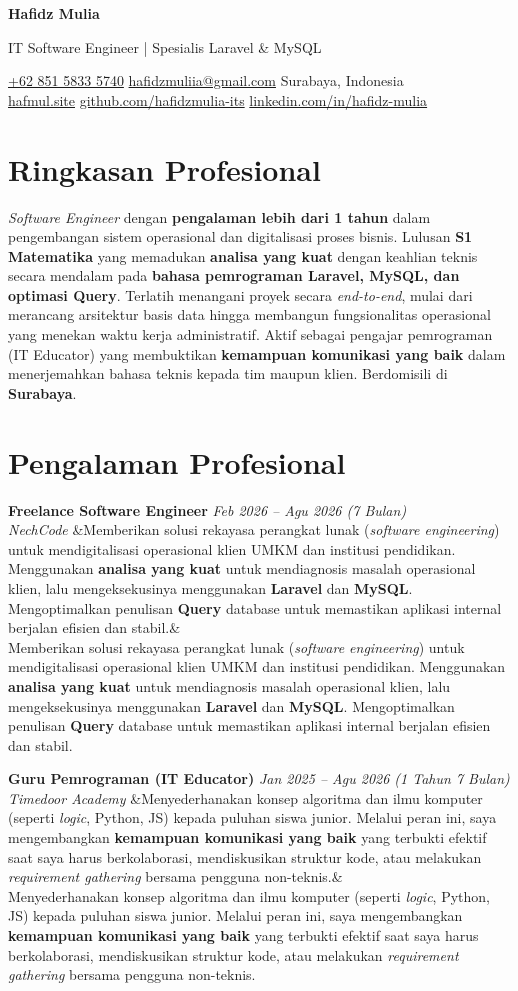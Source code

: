 \documentclass[a4paper,11pt]{article}
\newcommand{\cvname}[1]{%
  {\centering\LARGE\bfseries #1\par\vspace{2pt}}%
}
\newcommand{\cvtitle}[1]{%
  {\centering\large\color{accent} #1\par\vspace{4pt}}%
}
\newcommand{\cvcontact}[1]{%
  {\centering\small #1\par\vspace{6pt}}%
}
\newcommand{\cventry}[4]{%
  \noindent\textbf{#1} \hfill \textit{#3} \\
  \textit{#2}
  \ifx&#4& \else \\ \small #4 \fi
  \vspace{6pt}
}
\begin{document}
\cvname{Hafidz Mulia}
\cvtitle{IT Software Engineer | Spesialis Laravel \& MySQL}
\cvcontact{%
  \href{tel:+6285158335740}{+62 851 5833 5740} \quad\textbar\quad
  \href{mailto:hafidzmuliia@gmail.com}{hafidzmuliia@gmail.com} \quad\textbar\quad
  Surabaya, Indonesia \\
  \href{https://hafmul.site}{hafmul.site} \quad\textbar\quad
  \href{https://github.com/hafidzmulia-its}{github.com/hafidzmulia-its} \quad\textbar\quad
  \href{https://www.linkedin.com/in/hafidz-mulia/}{linkedin.com/in/hafidz-mulia}
}

\section{Ringkasan Profesional}
\textit{Software Engineer} dengan \textbf{pengalaman lebih dari 1 tahun} dalam pengembangan sistem operasional dan digitalisasi proses bisnis. Lulusan \textbf{S1 Matematika} yang memadukan \textbf{analisa yang kuat} dengan keahlian teknis secara mendalam pada \textbf{bahasa pemrograman Laravel, MySQL, dan optimasi Query}. Terlatih menangani proyek secara \textit{end-to-end}, mulai dari merancang arsitektur basis data hingga membangun fungsionalitas operasional yang menekan waktu kerja administratif. Aktif sebagai pengajar pemrograman (IT Educator) yang membuktikan \textbf{kemampuan komunikasi yang baik} dalam menerjemahkan bahasa teknis kepada tim maupun klien. Berdomisili di \textbf{Surabaya}.

\section{Pengalaman Profesional}

\cventry
  {Freelance Software Engineer}
  {NechCode}
  {Feb 2026 -- Agu 2026 (7 Bulan)}
  {Memberikan solusi rekayasa perangkat lunak (\textit{software engineering}) untuk mendigitalisasi operasional klien UMKM dan institusi pendidikan. Menggunakan \textbf{analisa yang kuat} untuk mendiagnosis masalah operasional klien, lalu mengeksekusinya menggunakan \textbf{Laravel} dan \textbf{MySQL}. Mengoptimalkan penulisan \textbf{Query} database untuk memastikan aplikasi internal berjalan efisien dan stabil.}

\cventry
  {Guru Pemrograman (IT Educator)}
  {Timedoor Academy}
  {Jan 2025 -- Agu 2026 (1 Tahun 7 Bulan)}
  {Menyederhanakan konsep algoritma dan ilmu komputer (seperti \textit{logic}, Python, JS) kepada puluhan siswa junior. Melalui peran ini, saya mengembangkan \textbf{kemampuan komunikasi yang baik} yang terbukti efektif saat saya harus berkolaborasi, mendiskusikan struktur kode, atau melakukan \textit{requirement gathering} bersama pengguna non-teknis.}
\end{document}
